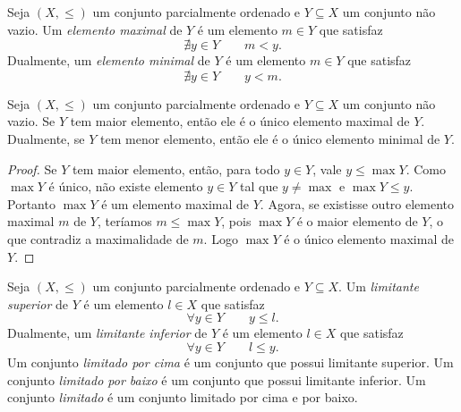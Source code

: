 \begin{definition}
	Seja $(X,\leq)$ um conjunto parcialmente ordenado e $Y \subseteq X$ um conjunto não vazio. Um \emph{elemento maximal} de $Y$ é um elemento $m \in Y$ que satisfaz
	\begin{equation*}
	\nexists y \in Y \qquad m < y.
	\end{equation*}
Dualmente, um \emph{elemento minimal} de $Y$ é um elemento $m \in Y$ que satisfaz
	\begin{equation*}
	\nexists y \in Y \qquad y < m.
	\end{equation*}
\end{definition}

\begin{proposition}
	Seja $(X,\leq)$ um conjunto parcialmente ordenado e $Y \subseteq X$ um conjunto não vazio. Se $Y$ tem maior elemento, então ele é o único elemento maximal de $Y$. Dualmente, se $Y$ tem menor elemento, então ele é o único elemento minimal de $Y$.
\end{proposition}
\begin{proof}
	Se $Y$ tem maior elemento, então, para todo $y \in Y$, vale $y \leq \max Y$. Como $\max Y$ é único, não existe elemento $y \in Y$ tal que $y \neq \max$ e $\max Y \leq y$. Portanto $\max Y$ é um elemento maximal de $Y$. Agora, se existisse outro elemento maximal $m$ de $Y$, teríamos $m \leq \max Y$, pois $\max Y$ é o maior elemento de $Y$, o que contradiz a maximalidade de $m$. Logo $\max Y$ é o único elemento maximal de $Y$.
\end{proof}

\begin{definition}
	Seja $(X,\leq)$ um conjunto parcialmente ordenado e $Y \subseteq X$. Um \emph{limitante superior} de $Y$ é um elemento $l \in X$ que satisfaz
	\begin{equation*}
	\forall y \in Y \qquad y \leq l.
	\end{equation*}
Dualmente, um \emph{limitante inferior} de $Y$ é um elemento $l \in X$ que satisfaz
	\begin{equation*}
	\forall y \in Y \qquad l \leq y.
	\end{equation*}
Um conjunto \emph{limitado por cima} é um  conjunto que possui limitante superior. Um conjunto \emph{limitado por baixo} é um conjunto que possui limitante inferior. Um conjunto \emph{limitado} é um conjunto limitado por cima e por baixo.
\end{definition}

